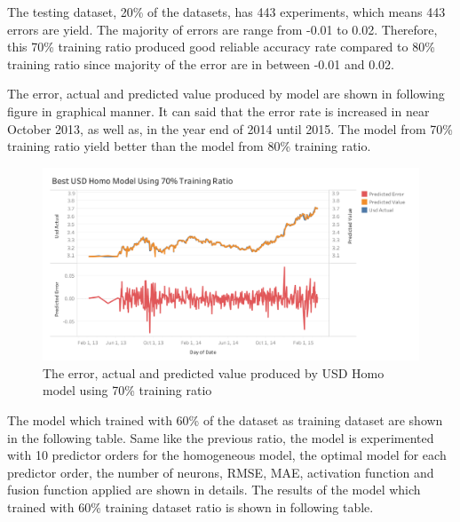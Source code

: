 {{The testing dataset, 20\% of the datasets, has 443 experiments, which means 443 errors are yield. The majority of errors are range from -0.01 to 0.02. Therefore, this 70\% training ratio produced good reliable accuracy rate compared to 80\% training ratio since majority of the error are in between -0.01 and 0.02.

The error, actual and predicted value produced by model are shown in following figure in graphical manner.  It can said that the error rate is increased in near October 2013, as well as, in the year end of 2014 until 2015. The model from 70\% training ratio yield better than the model from 80\% training ratio.

\begin{figure}[hbt!]\centering
	\includegraphics[width=1\textwidth]{best_usd_homo_APV_70}
	\caption{The error, actual and predicted value produced by USD Homo model using 70\% training ratio }
\end{figure}
\pagebreak

 
The model which trained with 60\% of the dataset as training dataset are shown in the following table. Same like the previous ratio, the model is  experimented with 10 predictor orders for the homogeneous model, the optimal model for each predictor order, the number of neurons, RMSE, MAE, activation function and fusion function applied are shown in details. The results of the model which trained with 60\% training dataset ratio is shown in following table.
\\

\setlength{\tabcolsep}{0.5em} %
{\renewcommand{\arraystretch}{1.2}
	
}}}
